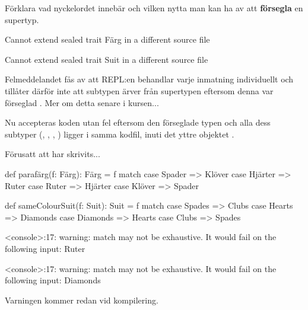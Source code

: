 \Subtask Förklara vad nyckelordet  innebär och vilken nytta man kan ha av att \textbf{försegla} en supertyp.


\SOLUTION


\TaskSolved \what

\SubtaskSolved
\ifswedish
\begin{REPL}
Cannot extend sealed trait Färg in a different source file
\end{REPL}
\else
\begin{REPL}
Cannot extend sealed trait Suit in a different source file
\end{REPL}
\fi
Felmeddelandet fås av att REPL:en behandlar varje inmatning individuellt och tillåter därför inte att subtypen \ifswedish{}\else{}\fi{} ärver från  supertypen \ifswedish{}\else{}\fi{} eftersom denna var förseglad . Mer om detta senare i kursen...

\SubtaskSolved
Nu accepteras koden utan fel eftersom den förseglade typen \ifswedish{}\else{}\fi{} och alla dess subtyper (\ifswedish{}\else{}\fi, \ifswedish{}\else{}\fi, \ifswedish{}\else{}\fi, \ifswedish{}\else{}\fi) ligger i samma kodfil, inuti det yttre objektet \ifswedish{}\else{}\fi.

\SubtaskSolved
Förusatt att \ifswedish{}\else{}\fi{} har skrivits...
\ifswedish
\begin{Code}
def parafärg(f: Färg): Färg = f match
  case Spader  => Klöver
  case Hjärter => Ruter
  case Ruter   => Hjärter
  case Klöver  => Spader
\end{Code}
\else
\begin{Code}
def sameColourSuit(f: Suit): Suit = f match
  case Spades  => Clubs
  case Hearts => Diamonds
  case Diamonds   => Hearts
  case Clubs  => Spades
\end{Code}
\fi

\SubtaskSolved
\ifswedish
\begin{REPL}
<console>:17: warning: match may not be exhaustive.
It would fail on the following input: Ruter
\end{REPL}
\else
\begin{REPL}
<console>:17: warning: match may not be exhaustive.
It would fail on the following input: Diamonds
\end{REPL}
\fi
Varningen kommer redan vid kompilering.

